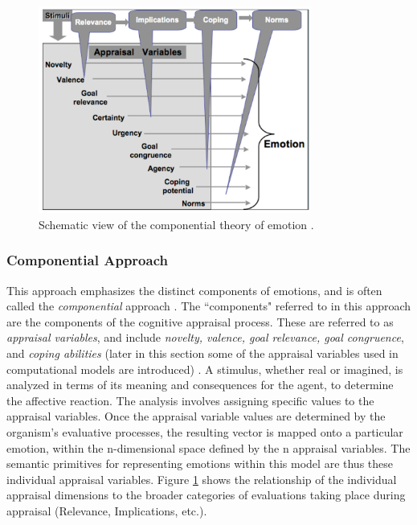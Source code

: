 \documentclass[12pt]{report}
\begin{document}
\begin{figure}[tbh]
  \center
  \includegraphics[width=0.8\textwidth]{figure/cpm.png}
  \caption{Schematic view of the componential theory of emotion
  \cite{hudlicka:guidelines-emotions}.}
  \label{fig:cpm}
\end{figure}

\subsubsection{Componential Approach}
\label{sec:componential-theories}

This approach emphasizes the distinct components of emotions, and is often
called the \textit{componential} approach \cite{leventhal:emotion-cognition}.
The ``components" referred to in this approach are the components of the
cognitive appraisal process. These are referred to as \textit{appraisal
variables}, and include \textit{novelty, valence, goal relevance, goal
congruence}, and \textit{coping abilities}
(later in this section some of the appraisal variables used in computational
models are introduced)
\cite{scherer:nature-function-emotion,scherer:appraisal-processes}. A stimulus,
whether real or imagined, is analyzed in terms of its meaning and consequences
for the agent, to determine the affective reaction. The analysis involves
assigning specific values to the appraisal variables. Once the appraisal
variable values are determined by the organism's evaluative processes, the
resulting vector is mapped onto a particular emotion, within the n-dimensional
space defined by the n appraisal variables. The semantic primitives for
representing emotions within this model are thus these individual appraisal
variables. Figure \ref{fig:cpm} shows the relationship of the individual
appraisal dimensions to the broader categories of evaluations taking place
during appraisal (Relevance, Implications, etc.).
\end{document}

